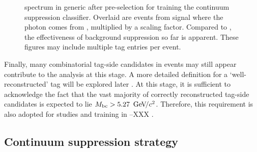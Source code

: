 \begin{figure}[htbp!]
    \centering
    \caption{\label{fig:preselected_photons} \BtoXsgamma spectrum in generic \MC after pre-selection for training the continuum suppression \BDT classifier.
    Overlaid are events from signal \MC where the photon comes from \BtoXsgamma, multiplied by a scaling factor.
    Compared to , the effectiveness of background suppression so far is apparent.
    These figures may include multiple tag entries per event.
    }
\end{figure}

Finally, many combinatorial tag-side candidates in \BB events may still appear contribute to the analysis at this stage.
A more detailed definition for a `well-reconstructed' tag will be explored later 
.
At this stage, it is sufficient to acknowledge the fact that the vast majority of correctly reconstructed tag-side candidates is expected to lie ${M_{\mathrm{bc}}}>5.27~{\mathrm{\,Ge\kern -0.1em V\!/}c^2}$.
Therefore, this requirement is also adopted for studies and training in --XXX
.

\subsection{Continuum suppression strategy}\label{sec:continuum_features}


